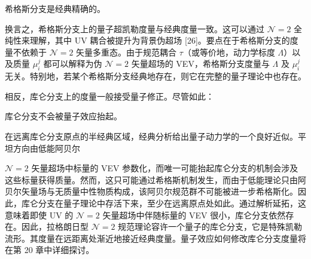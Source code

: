 \begin{proposition}[18.24]
希格斯分支是经典精确的。
\end{proposition}

换言之，希格斯分支上的量子超凯勒度量与经典度量一致。这可以通过 $\mathcal N=2$ 全纯性来理解，其中 UV 耦合被提升为背景伪超场 [26]。要点在于希格斯分支的度量不依赖于 $\mathcal N=2$ 矢量多重态。由于规范耦合 $\tau$（或等价地，动力学标度 $\Lambda$）以及质量 $\mu_i^j$ 都可以解释为伪 $\mathcal N=2$ 矢量超场的 VEV，希格斯分支度量与 $\Lambda$ 及 $\mu_i^j$ 无关。特别地，若某个希格斯分支经典地存在，则它在完整的量子理论中也存在。

相反，库仑分支上的度量一般接受量子修正。尽管如此：

\begin{proposition}[18.25]
库仑分支不会被量子效应抬起。
\end{proposition}

在远离库仑分支原点的半经典区域，经典分析给出量子动力学的一个良好近似。平坦方向由低能阿贝尔

$\mathcal N=2$ 矢量超场中标量的 VEV 参数化，而唯一可能抬起库仑分支的机制会涉及这些标量获得质量。然而，这只可能通过希格斯机制发生，而由于低能理论只由阿贝尔矢量场与无质量中性物质构成，该阿贝尔规范群不可能被进一步希格斯化。因此，库仑分支在量子理论中存活下来，至少在远离原点处如此。通过解析延拓，这意味着即使 UV 的 $\mathcal N=2$ 矢量超场中伴随标量的 VEV 很小，库仑分支依然存在。因此，拉格朗日型 $\mathcal N=2$ 规范理论容许一个量子的库仑分支，它是特殊凯勒流形。其度量在远距离处渐近地接近经典度量。量子效应如何修改库仑分支度量将在第 20 章中详细探讨。

